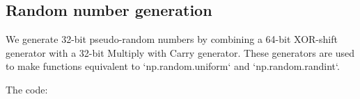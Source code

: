 \subsection{Random number generation}

We generate 32-bit pseudo-random numbers by combining a 64-bit XOR-shift generator with a 32-bit Multiply with Carry generator.
These generators are used to make functions equivalent to `np.random.uniform` and `np.random.randint`.

\noindent The code:
